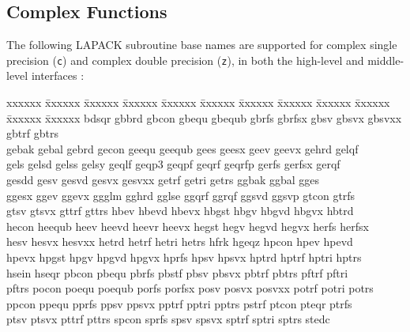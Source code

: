 \subsection{Complex Functions}

The following LAPACK subroutine base names are supported for complex single precision ({\tt c}) and complex double precision ({\tt z}), in both the high-level and middle-level interfaces
:

\begin{tabbing}
xxxxxx \= 
xxxxxx \= 
xxxxxx \=
xxxxxx \= 
xxxxxx \=
xxxxxx \=
xxxxxx \=
xxxxxx \=
xxxxxx \=
xxxxxx \=
xxxxxx \=
xxxxxx \kill
bdsqr \> 
gbbrd \> 
gbcon \>
gbequ \> 
gbequb \> 
gbrfs \> 
gbrfsx \>
gbsv \>
gbsvx \> 
gbsvxx \>
gbtrf \>
gbtrs \\ 
gebak \> 
gebal \> 
gebrd \> 
gecon \> 
geequ \> 
geequb \> 
gees \> 
geesx \> 
geev \> 
geevx \>
gehrd \> 
gelqf \\
gels \>
gelsd \>
gelss \>
gelsy \> 
geqlf \>
geqp3 \>
geqpf \>
geqrf \>
geqrfp \>
gerfs \>
gerfsx \>
gerqf \\
gesdd \>
gesv \>
gesvd \>
gesvx \>
gesvxx \>
getrf \>
getri \>
getrs \>
ggbak \>
ggbal \> 
gges \\
ggesx \>
ggev \>
ggevx \>
ggglm \>
gghrd \>
gglse \>
ggqrf \>
ggrqf \>
ggsvd \>
ggsvp \>
gtcon \>
gtrfs \\
gtsv \>
gtsvx \>
gttrf \>
gttrs \>
hbev \>
hbevd \>
hbevx \>
hbgst \>
hbgv \>
hbgvd \>
hbgvx \>
hbtrd \\
hecon \>
heequb \>
heev \>
heevd \>
heevr \>
heevx \>
hegst \>
hegv \>
hegvd \>
hegvx \>
herfs \>
herfsx \\
hesv \>
hesvx \>
hesvxx \>
hetrd \>
hetrf \>
hetri \>
hetrs \>
hfrk \>
hgeqz \>
hpcon \>
hpev \>
hpevd \\
hpevx \>
hpgst \>
hpgv \>
hpgvd \>
hpgvx \>
hprfs \>
hpsv \>
hpsvx \>
hptrd \>
hptrf \>
hptri \>
hptrs \\
hsein \>
hseqr \>
pbcon \>
pbequ \>
pbrfs \>
pbstf \>
pbsv \>
pbsvx \>
pbtrf \>
pbtrs \>
pftrf \>
pftri \\
pftrs \>
pocon \>
poequ \>
poequb \>
porfs \>
porfsx \>
posv \>
posvx \>
posvxx \>
potrf \>
potri \>
potrs \\
ppcon \>
ppequ \>
pprfs \>
ppsv \>
ppsvx \>
pptrf \>
pptri \>
pptrs \>
pstrf \>
ptcon \>
pteqr \>
ptrfs \\
ptsv \>
ptsvx \>
pttrf \>
pttrs \>
spcon \>
sprfs \>
spsv \>
spsvx \>
sptrf \>
sptri \>
sptrs \>
stedc \\

\end{tabbing}
